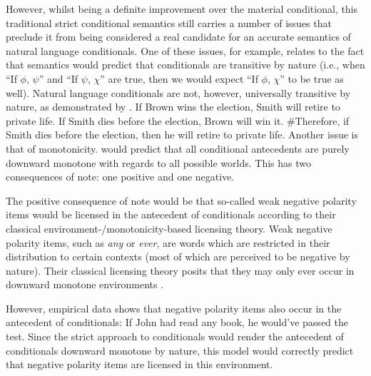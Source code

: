 However, whilst being a definite improvement over the material conditional, this traditional strict conditional semantics still carries a number of issues that preclude it from being considered a real candidate for an accurate semantics of natural language conditionals. One of these issues, for example, relates to the fact that  semantics would predict that conditionals are transitive by nature (i.e., when \enquote{If $\phi$, $\psi$} and \enquote{If $\psi$, $\chi$} are true, then we would expect \enquote{If $\phi$, $\chi$} to be true as well). Natural language conditionals are not, however, universally transitive by nature, as demonstrated by .
\ex
If Brown wins the election, Smith will retire to private life. If Smith dies before the election, Brown will win it. \#Therefore, if Smith dies before the election, then he will retire to private life.\hfill\parencite[p.~166]{Adams1965}
\xe
Another issue is that of monotonicity. \textcite{Lewis1912,Lewis1914,Lewis1918} would predict that all conditional antecedents are purely downward monotone with regards to all possible worlds. This has two consequences of note: one positive and one negative. 

The positive consequence of note would be that so-called weak negative polarity items would be licensed in the antecedent of conditionals according to their classical environment-/monotonicity-based licensing theory. Weak negative polarity items, such as \textit{any} or \textit{ever}, are words which are restricted in their distribution to certain contexts (most of which are perceived to be negative by nature). Their classical licensing theory posits that they may only ever occur in downward monotone environments \parencite{Ladusaw1980,Fauconnier1975a,Fauconnier1975b}. 
\ex\label{def:dm-intro}%

\xe
However, empirical data shows that negative polarity items also occur in the antecedent of conditionals:
\ex
If John had read any book, he would've passed the test.
\xe
Since the strict approach to conditionals would render the antecedent of conditionals downward monotone by nature, this model would correctly predict that negative polarity items are licensed in this environment.

